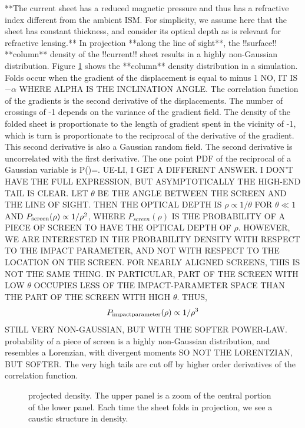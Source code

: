 \documentclass[useAMS,usenatbib]{mn2e}
\begin{document}
**The current sheet has a reduced magnetic pressure and thus has a refractive index different
from the ambient ISM. For simplicity, we assume here that the sheet has constant thickness, and
consider its optical depth as is relevant for refractive lensing.**
In projection **along the line of sight**, the !!surface!! **column** density of the !!current!! sheet 
results in a highly non-Gaussian
distribution. Figure \ref{fig:rho} shows the **column** density distribution in a
simulation.  Folds occur when the gradient of the displacement is
equal to minus 1 NO, IT IS $-\alpha$ WHERE ALPHA IS THE INCLINATION ANGLE.  The correlation function of the gradients is the
second derivative of the displacements.  The number of crossings of -1
depends on the variance of the gradient field.  The density of the
folded sheet is proportionate to the length of gradient spent in the
vicinity of -1, which is turn is proportionate to the reciprocal of
the derivative of the gradient.  This second derivative is also a
Gaussian random field.  The second derivative is uncorrelated with the
first derivative.  The one point PDF of the reciprocal of a Gaussian
variable is
\beq
P(\rho)=.
\eeq
UE-LI, I GET A DIFFERENT ANSWER. I DON'T HAVE THE FULL EXPRESSION, BUT 
ASYMPTOTICALLY THE HIGH-END TAIL IS CLEAR. LET $\theta$ BE THE ANGLE BETWEEN THE 
SCREEN AND THE LINE OF SIGHT.  THEN THE OPTICAL DEPTH IS $\rho\propto1/\theta$ FOR
$\theta\ll 1$ AND $P_{\rm screen}(\rho)\propto 1/\rho^2$, WHERE $P_{screen}(\rho)$ IS THE PROBABILITY OF A PIECE OF SCREEN TO HAVE THE OPTICAL DEPTH OF $\rho$. HOWEVER, WE ARE INTERESTED
IN THE PROBABILITY DENSITY WITH RESPECT TO THE IMPACT PARAMETER, AND NOT WITH RESPECT TO
THE LOCATION ON THE SCREEN. FOR NEARLY ALIGNED SCREENS, THIS IS NOT THE SAME THING.
IN PARTICULAR, PART OF THE SCREEN WITH LOW $\theta$ OCCUPIES LESS OF THE IMPACT-PARAMETER
SPACE THAN THE PART OF THE SCREEN WITH HIGH $\theta$. THUS, 
\begin{equation}
P_{\rm impact parameter}(\rho)\propto 1/\rho^3
\end{equation}
STILL VERY NON-GAUSSIAN, BUT WITH THE SOFTER POWER-LAW. 
probability of a piece of screen  is a highly non-Gaussian distribution, and resembles a Lorenzian,
with divergent moments SO NOT THE LORENTZIAN, BUT SOFTER.  The very
high tails are 
cut off by higher order derivatives of the correlation function.

\begin{figure}
\centerline{}
\caption{projected density.  The upper panel is a zoom of the central
  portion of the lower panel. Each time the sheet folds in projection,
we see a caustic structure in density.}
\label{fig:rho}
\end{figure}
\end{document}
